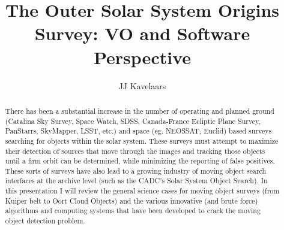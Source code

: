 
\resetcounters


 

\title{The Outer Solar System Origins Survey: VO and Software Perspective}
\author{JJ Kavelaars}


\begin{abstract}
There has been a substantial increase in the number of operating and planned ground (Catalina Sky Survey, Space Watch, SDSS, Canada-France Ecliptic Plane Survey, PanStarrs, SkyMapper, LSST, etc.) and space (eg. NEOSSAT, Euclid) based surveys searching for objects within the solar system. These surveys must attempt to maximize their detection of sources that move through the images and tracking those objects until a firm orbit can be determined, while minimizing the reporting of false positives. These sorts of surveys have also lead to a growing industry of moving object search interfaces at the archive level (such as the CADC's Solar System Object Search). In this presentation I will review the general science cases for moving object surveys (from Kuiper belt to Oort Cloud Objects) and the various innovative (and brute force) algorithms and computing systems that have been developed to crack the moving object detection problem.
\end{abstract}

